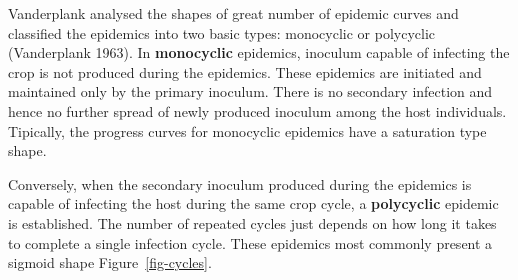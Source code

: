 \documentclass[
  letterpaper,
]{book}
\begin{document}
Vanderplank analysed the shapes of great number of epidemic curves and
classified the epidemics into two basic types: monocyclic or polycyclic
(Vanderplank 1963). In \textbf{monocyclic} epidemics, inoculum capable
of infecting the crop is not produced during the epidemics. These
epidemics are initiated and maintained only by the primary inoculum.
There is no secondary infection and hence no further spread of newly
produced inoculum among the host individuals. Tipically, the progress
curves for monocyclic epidemics have a saturation type shape.

Conversely, when the secondary inoculum produced during the epidemics is
capable of infecting the host during the same crop cycle, a
\textbf{polycyclic} epidemic is established. The number of repeated
cycles just depends on how long it takes to complete a single infection
cycle. These epidemics most commonly present a sigmoid shape
Figure~\ref{fig-cycles}.
\end{document}
